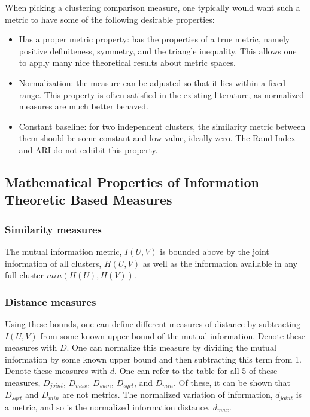 \documentclass{article}
\begin{document}
When picking a clustering comparison measure, one typically would want such a metric to have some of the following desirable properties:
\begin{itemize}
\item Has a proper metric property: has the properties of a true metric, namely positive definiteness, symmetry, and the triangle inequality. This allows one to apply many nice theoretical results about metric spaces.
\item Normalization: the measure can be adjusted so that it lies within a fixed range. This property is often satisfied in the existing literature, as normalized measures are much better behaved.
\item Constant baseline: for two independent clusters, the similarity metric between them should be some constant and low value, ideally zero. The Rand Index and ARI do not exhibit this property.
\end{itemize}


\subsection{Mathematical Properties of Information Theoretic Based Measures}

\subsubsection{Similarity measures}

The mutual information metric, $I(U,V)$ is bounded above by the joint information of all clusters, $H(U,V)$ as well as the information available in any full cluster $min(H(U),H(V))$. 

\subsubsection{Distance measures}

Using these bounds, one can define different measures of distance by subtracting $I(U,V)$ from some known upper bound of the mutual information. Denote these measures with $D$. One can normalize this measure by dividing the mutual information by some known upper bound and then subtracting this term from 1. Denote these measures with $d$. One can refer to the table for all 5 of these measures, $D_{joint}$, $D_{max}$, $D_{sum}$, $D_{sqrt}$, and $D_{min}$. Of these, it can be shown that $D_{sqrt}$ and $D_{min}$ are not metrics. The normalized variation of information, $d_{joint}$ is a metric, and so is the normalized information distance, $d_{max}$. 
\end{document}
